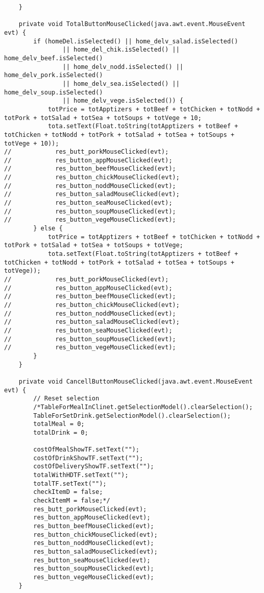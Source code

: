 \documentclass[12pt,a4paper]{article}
\begin{document}
\begin{lstlisting}
    }                                            

    private void TotalButtonMouseClicked(java.awt.event.MouseEvent evt) {                                         
        if (homeDel.isSelected() || home_delv_salad.isSelected()
                || home_del_chik.isSelected() || home_delv_beef.isSelected()
                || home_delv_nodd.isSelected() || home_delv_pork.isSelected()
                || home_delv_sea.isSelected() || home_delv_soup.isSelected()
                || home_delv_vege.isSelected()) {
            totPrice = totApptizers + totBeef + totChicken + totNodd + totPork + totSalad + totSea + totSoups + totVege + 10;
            tota.setText(Float.toString(totApptizers + totBeef + totChicken + totNodd + totPork + totSalad + totSea + totSoups + totVege + 10));
//            res_butt_porkMouseClicked(evt);
//            res_button_appMouseClicked(evt);
//            res_button_beefMouseClicked(evt);
//            res_button_chickMouseClicked(evt);
//            res_button_noddMouseClicked(evt);
//            res_button_saladMouseClicked(evt);
//            res_button_seaMouseClicked(evt);
//            res_button_soupMouseClicked(evt);
//            res_button_vegeMouseClicked(evt);
        } else {
            totPrice = totApptizers + totBeef + totChicken + totNodd + totPork + totSalad + totSea + totSoups + totVege;
            tota.setText(Float.toString(totApptizers + totBeef + totChicken + totNodd + totPork + totSalad + totSea + totSoups + totVege));
//            res_butt_porkMouseClicked(evt);
//            res_button_appMouseClicked(evt);
//            res_button_beefMouseClicked(evt);
//            res_button_chickMouseClicked(evt);
//            res_button_noddMouseClicked(evt);
//            res_button_saladMouseClicked(evt);
//            res_button_seaMouseClicked(evt);
//            res_button_soupMouseClicked(evt);
//            res_button_vegeMouseClicked(evt);
        }
    }                                        

    private void CancellButtonMouseClicked(java.awt.event.MouseEvent evt) {                                           
        // Reset selection
        /*TableForMealInClinet.getSelectionModel().clearSelection();
        TableForSetDrink.getSelectionModel().clearSelection();
        totalMeal = 0;
        totalDrink = 0;

        costOfMealShowTF.setText("");
        costOfDrinkShowTF.setText("");
        costOfDeliveryShowTF.setText("");
        totalWithHDTF.setText("");
        totalTF.setText("");
        checkItemD = false;
        checkItemM = false;*/
        res_butt_porkMouseClicked(evt);
        res_button_appMouseClicked(evt);
        res_button_beefMouseClicked(evt);
        res_button_chickMouseClicked(evt);
        res_button_noddMouseClicked(evt);
        res_button_saladMouseClicked(evt);
        res_button_seaMouseClicked(evt);
        res_button_soupMouseClicked(evt);
        res_button_vegeMouseClicked(evt);
    }                                          


\end{lstlisting}
\end{document}
